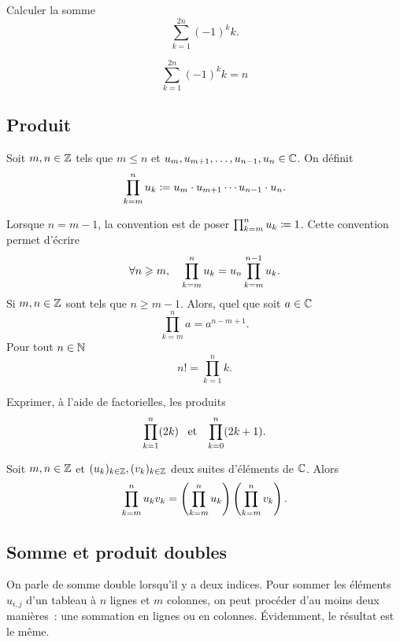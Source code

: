 \documentclass{magnoliaold}
\begin{document}
\begin{exoUnique}
\exo Calculer la somme
  \[\sum_{k=1}^{2n} (-1)^k k.\]
  \begin{sol}
\[\sum_{k=1}^{2n} (-1)^k k=n\]
  \end{sol}
\end{exoUnique}


\subsection{Produit}

\begin{definition}[utile=-3]
Soit $m,n\in\mathbb{Z}$ tels que $m\leq n$ et $u_{m},u_{m+1},\ldots,u_{n-1},u_n\in\mathbb{C}$. On
définit
\[\prod_{k=m}^n u_k\coloneqq u_{m}\cdot u_{m+1}\cdots u_{n-1}\cdot u_n.\]
\end{definition}

\begin{remarques}
\remarque Lorsque $n=m-1$, la convention est de poser $\prod_{k=m}^n u_k\coloneqq 1$. Cette
  convention permet d'écrire
  \[\forall n\geqslant m,\quad \prod_{k=m}^n u_k = u_n  \prod_{k=m}^{n-1} u_k.\]
\remarque Si $m,n\in\mathbb{Z}$ sont tels que $n\geq m-1$. Alors, quel que soit $a\in\mathbb{C}$
  \[\prod_{k=m}^{n} a =a^{n-m+1}.\]
\remarque Pour tout $n\in\mathbb{N}$
   \[n!=\prod_{k=1}^n k.\]
\end{remarques}

\begin{exoUnique}
\exo Exprimer, à l'aide de factorielles, les produits
  \[\prod_{k=1}^n (2k) \quad\!\text{et}\quad\! \prod_{k=0}^n (2k+1).\]
\end{exoUnique}

\begin{proposition}
Soit $m,n\in\mathbb{Z}$ et $(u_k)_{k\in\mathbb{Z}}, (v_k)_{k\in\mathbb{Z}}$ deux suites d'éléments de $\mathbb{C}$. Alors
\[\prod_{k=m}^n u_k v_k=\left(\prod_{k=m}^n u_k\right) \left(\prod_{k=m}^n v_k\right).\]
\end{proposition}

\subsection{Somme et produit doubles}

On parle de somme double lorsqu'il y a deux indices. Pour sommer les éléments
$u_{i,j}$ d'un tableau à $n$ lignes et $m$ colonnes, on peut procéder d'au
moins deux manières~: une sommation en lignes ou en colonnes. Évidemment, le résultat est le même. 
\end{document}
